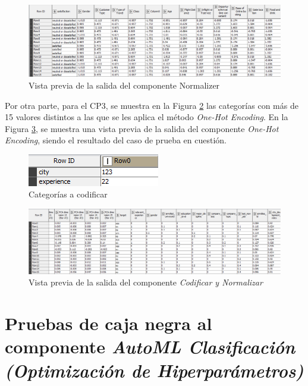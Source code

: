 \begin{figure}[H]
	\centering
	\includegraphics[width=0.8\linewidth]{"figuras/capi 3/pruebas-jenn/norm-cp1"}
	\caption{Vista previa de la salida del componente Normalizer}
	\label{fig:norm-cp1}
\end{figure}



Por otra parte, para el CP3, se muestra en la Figura \ref{fig:categorias-a-codificar} las categorías con más de 15 valores distintos a las que se les aplica el método \textit{One-Hot Encoding}. En la Figura \ref{fig:resultado-cp3-codif-norm}, se muestra una vista previa de la salida del componente \textit{One-Hot Encoding}, siendo el resultado del caso de prueba en cuestión. 

\begin{figure}[H]
	\centering
	\includegraphics[width=0.4\linewidth]{"figuras/capi 3/pruebas-jenn/categorias-a-codificar"}
	\caption{Categorías a codificar}
	\label{fig:categorias-a-codificar}
\end{figure}

\begin{figure}[H]
	\centering
	\includegraphics[width=0.8\linewidth]{"figuras/capi 3/pruebas-jenn/resultado-cp3-codif-norm"}
	\caption{Vista previa de la salida del componente \textit{Codificar y Normalizar}}
	\label{fig:resultado-cp3-codif-norm}
\end{figure}


\section{Pruebas de caja negra al componente \textit{AutoML Clasificación (Optimización de Hiperparámetros)}}

